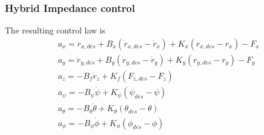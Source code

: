 \begin{frame}
  \frametitle{Hybrid Impedance control}
  The resulting control law is
  \begin{align*}
    & a_x = \ddot{r}_{x,des} + B_x (\dot{r}_{x,des} - \dot{r}_x) + K_x (r_{x,des} - r_x) - F_x \\
    & a_y = \ddot{r}_{y,des} + B_y (\dot{r}_{y,des} - \dot{r}_y) + K_y (r_{y,des} - r_y) - F_y \\
    & a_z = - B_f \dot{r}_z + K_f(F_{z,des} - F_z) \\
    & a_{\psi} = - B_{\psi} \dot{\psi} + K_{\psi} (\psi_{des} - \psi) \\
    & a_{\theta} = - B_{\theta} \dot{\theta} + K_{\theta} (\theta_{des} - \theta) \\
    & a_{\phi} = - B_{\phi} \dot{\phi} + K_{\phi} (\phi_{des} - \phi)
  \end{align*}
\end{frame}

